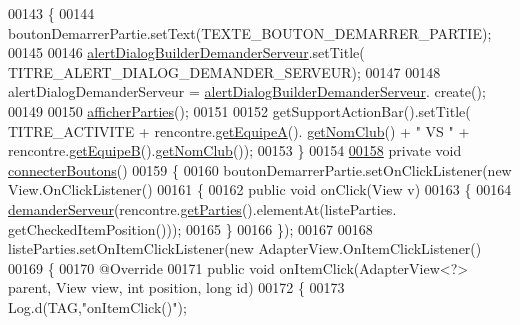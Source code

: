 \begin{DoxyCode}
00143     \{
00144         boutonDemarrerPartie.setText(TEXTE\_BOUTON\_DEMARRER\_PARTIE);
00145 
00146         \hyperlink{classcom_1_1example_1_1area_1_1_i_h_m_gestion_rencontre_a47ed7018b2af1ac9197715b9008a34a5}{alertDialogBuilderDemanderServeur}.setTitle(
      TITRE\_ALERT\_DIALOG\_DEMANDER\_SERVEUR);
00147 
00148         alertDialogDemanderServeur = \hyperlink{classcom_1_1example_1_1area_1_1_i_h_m_gestion_rencontre_a47ed7018b2af1ac9197715b9008a34a5}{alertDialogBuilderDemanderServeur}.
      create();
00149 
00150         \hyperlink{classcom_1_1example_1_1area_1_1_i_h_m_gestion_rencontre_a5d86e4705a4bbea19f05781403df4742}{afficherParties}();
00151 
00152         getSupportActionBar().setTitle( TITRE\_ACTIVITE + rencontre.\hyperlink{classcom_1_1example_1_1area_1_1_rencontre_a207498fd691285b28b0a720da0a660f8}{getEquipeA}().
      \hyperlink{classcom_1_1example_1_1area_1_1_equipe_a735e5e0aaac9ac2c17f3eca3d47862dc}{getNomClub}() + \textcolor{stringliteral}{" VS "} + rencontre.\hyperlink{classcom_1_1example_1_1area_1_1_rencontre_a83deec026e26407049c5671672291170}{getEquipeB}().\hyperlink{classcom_1_1example_1_1area_1_1_equipe_a735e5e0aaac9ac2c17f3eca3d47862dc}{getNomClub}());
00153     \}
00154 
\hyperlink{classcom_1_1example_1_1area_1_1_i_h_m_gestion_rencontre_a3d4decb257b09dafa98f4a6accc8c15d}{00158}     \textcolor{keyword}{private} \textcolor{keywordtype}{void} \hyperlink{classcom_1_1example_1_1area_1_1_i_h_m_gestion_rencontre_a3d4decb257b09dafa98f4a6accc8c15d}{connecterBoutons}()
00159     \{
00160         boutonDemarrerPartie.setOnClickListener(\textcolor{keyword}{new} View.OnClickListener()
00161         \{
00162             \textcolor{keyword}{public} \textcolor{keywordtype}{void} onClick(View v)
00163             \{
00164                 \hyperlink{classcom_1_1example_1_1area_1_1_i_h_m_gestion_rencontre_a34d405f3c30f6d040b2db3a6ee54a2f4}{demanderServeur}(rencontre.\hyperlink{classcom_1_1example_1_1area_1_1_rencontre_a58b62bd2f8a63f532df2bc8607268a2d}{getParties}().elementAt(listeParties.
      getCheckedItemPosition()));
00165             \}
00166         \});
00167 
00168         listeParties.setOnItemClickListener(\textcolor{keyword}{new} AdapterView.OnItemClickListener()
00169         \{
00170             @Override
00171             \textcolor{keyword}{public} \textcolor{keywordtype}{void} onItemClick(AdapterView<?> parent, View view, \textcolor{keywordtype}{int} position, \textcolor{keywordtype}{long} \textcolor{keywordtype}{id})
00172             \{
00173                 Log.d(TAG,\textcolor{stringliteral}{"onItemClick()"});

\end{DoxyCode}
